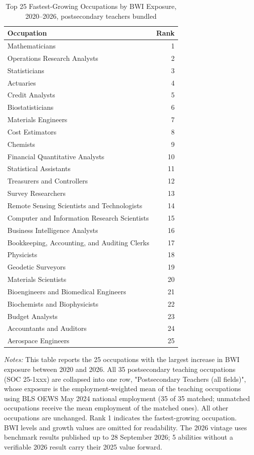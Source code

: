 \begin{table}[htbp]\centering
\caption{Top 25 Fastest-Growing Occupations by BWI Exposure, 2020--2026, postsecondary teachers bundled}\label{tab:table_fastest25_teachers_bundled}
\begin{tabular}{lr}\toprule
Occupation & Rank \\ \midrule
Mathematicians & 1 \\
Operations Research Analysts & 2 \\
Statisticians & 3 \\
Actuaries & 4 \\
Credit Analysts & 5 \\
Biostatisticians & 6 \\
Materials Engineers & 7 \\
Cost Estimators & 8 \\
Chemists & 9 \\
Financial Quantitative Analysts & 10 \\
Statistical Assistants & 11 \\
Treasurers and Controllers & 12 \\
Survey Researchers & 13 \\
Remote Sensing Scientists and Technologists & 14 \\
Computer and Information Research Scientists & 15 \\
Business Intelligence Analysts & 16 \\
Bookkeeping, Accounting, and Auditing Clerks & 17 \\
Physicists & 18 \\
Geodetic Surveyors & 19 \\
Materials Scientists & 20 \\
Bioengineers and Biomedical Engineers & 21 \\
Biochemists and Biophysicists & 22 \\
Budget Analysts & 23 \\
Accountants and Auditors & 24 \\
Aerospace Engineers & 25 \\
\bottomrule\end{tabular}
\begin{minipage}{0.95\linewidth}\footnotesize \textit{Notes:} This table reports the 25 occupations with the largest increase in BWI exposure between 2020 and 2026. All 35 postsecondary teaching occupations (SOC 25-1xxx) are collapsed into one row, "Postsecondary Teachers (all fields)", whose exposure is the employment-weighted mean of the teaching occupations using BLS OEWS May 2024 national employment (35 of 35 matched; unmatched occupations receive the mean employment of the matched ones). All other occupations are unchanged. Rank 1 indicates the fastest-growing occupation. BWI levels and growth values are omitted for readability. The 2026 vintage uses benchmark results published up to 28 September 2026; 5 abilities without a verifiable 2026 result carry their 2025 value forward.\end{minipage}
\end{table}
